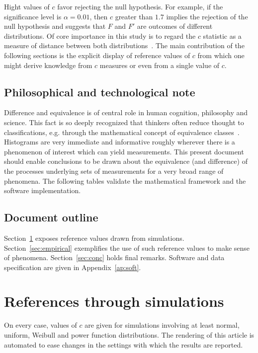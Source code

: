 \documentclass[%
	aip,
	jmp,%
	amsmath,amssymb,
	reprint,%
]{revtex4-1}
\begin{document}
Hight values of $c$ favor rejecting the null hypothesis.
For example, if the significance level is $\alpha=0.01$,
then $c$ greater than $1.7$
implies the rejection of the null hypothesis and
suggests that $F$ and $F'$
are outcomes of different distributions.
Of core importance in this study is to regard the $c$ statistic
as a measure of distance between both distributions~\cite{kolm}.
The main contribution of the following sections is the
explicit display of reference values of $c$
from which one might derive knowledge from
$c$ measures or even from a single value of $c$.

\subsection{Philosophical and technological note}
Difference and equivalence is of central role in human cognition,
philosophy and science.
This fact is so deeply recognized that thinkers often reduce
thought to classifications, e.g. through the
mathematical concept of equivalence classes~\cite{deleuze}.
Histograms are very immediate and informative
roughly wherever there is a phenomenon of interest which can yield measurements.
This present document should enable conclusions to be drawn about 
the equivalence (and difference)
of the processes underlying sets of measurements for a very
broad range of phenomena.
The following tables 
validate the mathematical framework
and the software implementation.

\subsection{Document outline}
Section~\ref{sec:simulations} exposes reference values drawn from simulations.
Section~\ref{sec:empirical} exemplifies the use of such reference values
to make sense of phenomena.
Section~\ref{sec:conc} holds final remarks.
Software and data specification are given in Appendix~\ref{ap:soft}.

\section{References through simulations}\label{sec:simulations}
On every case, values of $c$ are given for simulations involving
at least normal, uniform, Weibull and power function distributions.
The rendering of this article is automated to ease changes in
the settings with which the results are reported.

\end{document}
